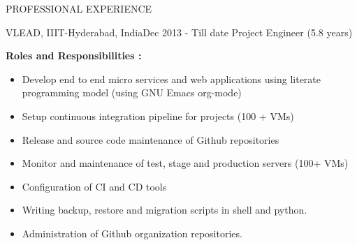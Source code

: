 \documentclass{resume} %
\begin{document}
\begin{rSection}{PROFESSIONAL EXPERIENCE}
  
  \begin{rSubsection}
    {VLEAD, IIIT-Hyderabad, India}{Dec 2013 - Till date}
    {Project Engineer} {(5.8 years)}

    \textbf{Roles and Responsibilities :}

    \begin{itemize}
      
    \item Develop end to end micro services and web
      applications using literate programming model (using
      GNU Emacs org-mode)

    \item Setup continuous integration pipeline for projects
      (100 + VMs)

    \item Release and source code maintenance of Github
      repositories
      
    \item Monitor and maintenance of test, stage and production
      servers (100+ VMs)
      
    \item Configuration of CI and CD tools
      
    \item Writing backup, restore and migration scripts in
      shell and python.

    \item Administration of Github organization
      repositories.


\end{itemize}
\end{rSubsection}
\end{rSection}
\end{document}
